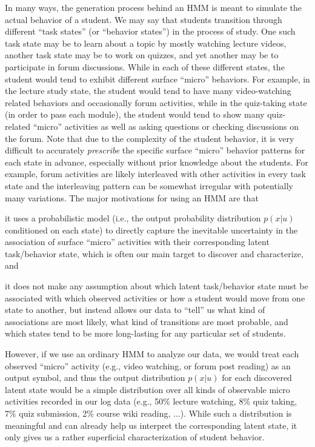 In many ways, the generation process behind an HMM is meant to simulate the
actual behavior of a student. We may say that students transition through different ``task states'' (or ``behavior states'')  in the process of study. 
One such task state may be to learn about a topic by mostly watching
lecture videos, another task state may be to work on quizzes, and yet
another may be to participate in forum discussions. While in each of these
different states, the student would tend to exhibit different surface
``micro'' behaviors. For example, in the lecture study state, the student
would tend to have many video-watching related behaviors and occasionally
forum activities, while in the quiz-taking state (in order to pass each
module), the student would tend to show many quiz-related ``micro''
activities as well as asking questions or checking discussions on the
forum. Note that due to the complexity of the student behavior, it is very
difficult to accurately {\em prescribe} the specific surface ``micro''
behavior patterns for each state in advance, especially without  prior knowledge about the students. For example, forum activities are likely interleaved with other activities   in every task state and the interleaving pattern can be somewhat irregular with potentially many variations. 
The major motivations for using an HMM are that 
\begin{enumerate*}[label=(\arabic*)]
    \item it uses a probabilistic model (i.e., the output probability distribution $p(x|u)$ conditioned on each state) to directly capture the inevitable uncertainty in the association of surface ``micro'' activities with their corresponding latent task/behavior state, which is often our main target to discover and characterize, and 
    \item it does not make any assumption about which latent task/behavior
      state must be associated with which observed activities or how a
      student would move from one state to another, but instead allows our
      data to ``tell'' us what kind of associations are most likely,
      what kind of transitions are most probable, and which states tend to be more long-lasting for any particular set of students. 
\end{enumerate*}

However, if we use an ordinary HMM to analyze our data, we would treat each
observed ``micro'' activity (e.g., video watching, or forum post reading)
as an output symbol, and thus the output distribution $p(x|u)$ for each
discovered latent state would be a simple distribution over all kinds of
observable micro activities recorded in our log data (e.g., 50\% lecture
watching, 8\% quiz taking, 7\% quiz submission, 2\% course wiki reading,
...). While such a distribution is meaningful and can already help us
interpret the corresponding latent state, it only gives us a rather
superficial characterization of student behavior.

